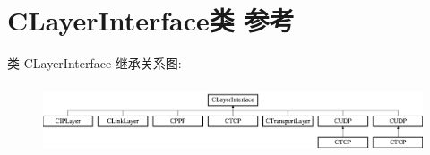 \hypertarget{class_c_layer_interface}{}\section{C\+Layer\+Interface类 参考}
\label{class_c_layer_interface}
类 C\+Layer\+Interface 继承关系图\+:\begin{figure}[H]
\begin{center}
\leavevmode
\includegraphics[height=2.068965cm]{class_c_layer_interface}
\end{center}
\end{figure}
